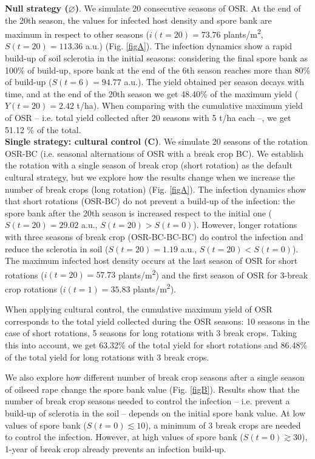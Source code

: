 \documentclass{article}
\begin{document}
\textbf{Null strategy ($\varnothing$)}. We simulate 20 consecutive seasons of OSR. At the end of the 20th season, the values for infected host density and spore bank are maximum in respect to other seasons ($i(t = 20) = 73.76$ plants/m\textsuperscript{2}, $S(t = 20) = 113.36$ a.u.)  (Fig. \ref{figA}). The infection dynamics show a rapid build-up of soil sclerotia in the initial seasons: considering the final spore bank as 100\% of build-up, spore bank at the end of the 6th season reaches more than 80\% of build-up ($S(t = 6) = 94.77$ a.u.). The yield obtained per season decays with time, and at the end of the 20th season we get 48.40\% of the maximum yield ($Y(t = 20) = 2.42$ t/ha). When comparing with the cumulative maximum yield of OSR -- i.e. total yield collected after 20 seasons with 5 t/ha each --, we get 51.12 \% of the total. 
\\
 
 \textbf{Single strategy: cultural control (C)}. We simulate 20 seasons of the rotation OSR-BC (i.e. seasonal alternations of OSR with a break crop BC).  We establish the rotation with a single season of break crop (short rotation) as the default cultural strategy, but we explore how the results change when we increase the number of break crops (long rotation)  (Fig. \ref{figA}). The infection dynamics show that short rotations (OSR-BC) do not prevent a build-up of the infection: the spore bank after the 20th season is increased respect to the initial one ($S(t = 20) = 29.02$ a.u., $S(t = 20) > S(t=0)$). However, longer rotations with three seasons of break crop (OSR-BC-BC-BC) do control the infection and reduce the sclerotia in soil ($S(t = 20) = 1.19$ a.u., $S(t = 20) < S(t=0)$). The maximum infected host density occurs at the last season of OSR for short rotations ($i(t = 20) = 57.73$ plants/m\textsuperscript{2}) and the first season of OSR for 3-break crop rotations ($i(t = 1) = 35.83$ plants/m\textsuperscript{2}). 
 
 When applying cultural control, the cumulative maximum yield of OSR corresponds to the total yield collected during the OSR seasons: 10 seasons in the case of short rotations, 5 seasons for long rotations with 3 break crops. Taking this into account, we get 63.32\% of the total yield for short rotations and 86.48\% of the total yield for long rotations with 3 break crops. 
 
We also explore how different number of break crop seasons after a single season of oilseed rape change the spore bank value  (Fig. \ref{figB}). Results show that the number of break crop seasons needed to control the infection -- i.e. prevent a build-up of sclerotia in the soil -- depends on the initial spore bank value. At low values of spore bank ($S(t = 0) \lesssim 10$), a minimum of 3 break crops are needed to control the infection. However, at high values of spore bank ($S(t = 0) \gtrsim 30$), 1-year of break crop already prevents an infection build-up. 
 
\end{document}
